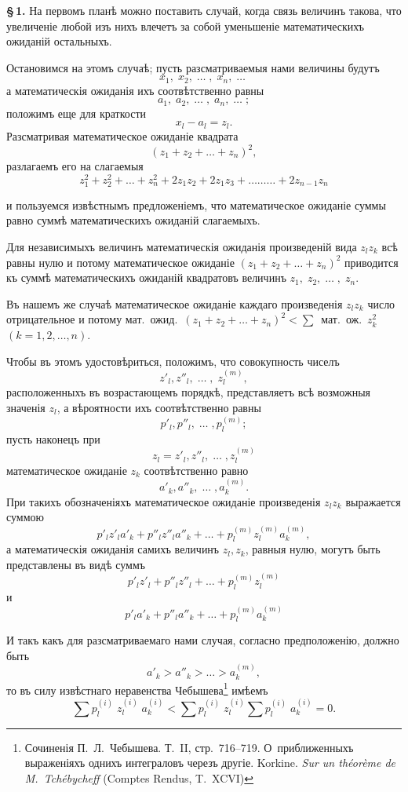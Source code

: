 \documentclass[12pt]{article}
\begin{document}
\medskip

\noindent\textbf{\S\,1.} На первомъ планѣ можно поставить случай, когда связь величинъ такова, что увеличеніе любой изъ нихъ влечетъ за собой уменьшеніе математическихъ ожиданій остальныхъ.

Остановимся на этомъ случаѣ; пусть разсматриваемыя нами величины будутъ
\[
x_1,\; x_2,\; \ldots\;,\; x_n,\; \ldots\;
\]
а математическія ожиданія ихъ соотвѣтственно равны
\[
a_1,\; a_2,\; \ldots\;,\; a_n,\; \ldots\;;
\]
положимъ еще для краткости
\[
x_l - a_l = z_l.
\]
Разсматривая математическое ожиданіе квадрата
\[
(z_1 + z_2 + \ldots + z_n)^2,
\]
разлагаемъ его на слагаемыя
\[
z_1^2 + z_2^2 + \ldots + z_n^2 + 2z_1 z_2 + 2z_1 z_3 + \ldots\ldots\ldots + 2z_{n-1} z_n
\]


\noindent и пользуемся извѣстнымъ предложеніемъ, что математическое ожиданіе суммы равно суммѣ математическихъ ожиданій слагаемыхъ.

Для независимыхъ величинъ математическія ожиданія произведеній вида $z_l z_k$ всѣ равны нулю и потому математическое ожиданіе $(z_1 + z_2 + \ldots + z_n)^2$ приводится къ суммѣ математическихъ ожиданій квадратовъ величинъ $z_1,\; z_2,\; \ldots\;,\; z_n$.

Въ нашемъ же случаѣ математическое ожиданіе каждаго произведенія $z_l z_k$ число отрицательное и потому мат.~ожид.\ $(z_1 + z_2 + \ldots + z_n)^2 {<} \sum$~мат.~ож.\ $z^2_k$ \;$(k = 1, 2, \ldots, n)$.

Чтобы въ этомъ удостовѣриться, положимъ, что совокупность чиселъ
\[
z'_l, z''_l, \;\ldots\;,\; z_l^{(m)},
\]
расположенныхъ въ возрастающемъ порядкѣ, представляетъ всѣ возможныя значенія $z_l$, а вѣроятности ихъ соотвѣтственно равны
\[
p'_l, p''_l, \;\ldots\;, p_l^{(m)};
\]
пусть наконецъ при
\[
z_l = z'_l, z''_l, \;\ldots\;, z_l^{(m)}
\]
математическое ожиданіе $z_k$ соотвѣтственно равно
\[
a'_k, a''_k, \;\ldots\;, a_k^{(m)}.
\]
При такихъ обозначеніяхъ математическое ожиданіе произведенія $z_l z_k$ выражается суммою
\[
p'_l z'_l a'_k + p''_l z''_l a''_k + \ldots + p_l^{(m)} z_l^{(m)} a_k^{(m)},
\]
а математическія ожиданія самихъ величинъ $z_l, z_k$, равныя нулю, могутъ быть представлены въ видѣ суммъ
\[
p'_l z'_l + p''_l z''_l + \ldots + p_l^{(m)} z_l^{(m)}
\]
и
\[
p'_l a'_k + p''_l a''_k + \ldots + p_l^{(m)} a_k^{(m)}
\]


\noindent И такъ какъ для разсматриваемаго нами случая, согласно предположенію, должно быть
\[
a'_k > a''_k > \ldots > a_k^{(m)},
\]
то въ силу извѣстнаго неравенства Чебышева\footnote{Сочиненія П.~Л.~Чебышева. Т.~II, стр.~716--719. О~приближенныхъ выраженіяхъ однихъ интеграловъ черезъ другіе. Korkine. \textit{Sur un th\'eor\`eme de M.~Tch\'ebycheff} (Comptes Rendus, T.~XCVI)} имѣемъ
\[
\sum p_l^{(i)}\; z_l^{(i)}\; a_k^{(i)} < \sum p_l^{(i)}\; z_l^{(i)} \sum p_l^{(i)}\; a_k^{(i)} = 0.
\]
\end{document}
